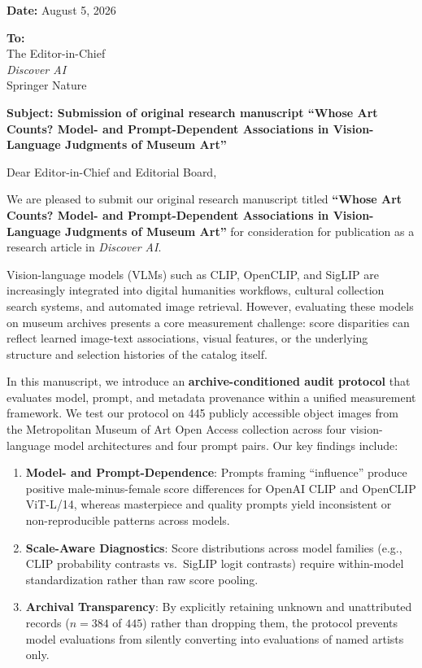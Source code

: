 \documentclass[11pt,a4paper]{article}
\begin{document}
\begin{raggedleft}
\textbf{Date:} August 5, 2026\\
\end{raggedleft}

\textbf{To:}\\
The Editor-in-Chief\\
\textit{Discover AI}\\
Springer Nature\\

\vspace{1em}

\textbf{Subject: Submission of original research manuscript ``Whose Art Counts? Model- and Prompt-Dependent Associations in Vision-Language Judgments of Museum Art''}

\vspace{1em}

Dear Editor-in-Chief and Editorial Board,

We are pleased to submit our original research manuscript titled \textbf{``Whose Art Counts? Model- and Prompt-Dependent Associations in Vision-Language Judgments of Museum Art''} for consideration for publication as a research article in \textit{Discover AI}.

Vision-language models (VLMs) such as CLIP, OpenCLIP, and SigLIP are increasingly integrated into digital humanities workflows, cultural collection search systems, and automated image retrieval. However, evaluating these models on museum archives presents a core measurement challenge: score disparities can reflect learned image-text associations, visual features, or the underlying structure and selection histories of the catalog itself. 

In this manuscript, we introduce an \textbf{archive-conditioned audit protocol} that evaluates model, prompt, and metadata provenance within a unified measurement framework. We test our protocol on 445 publicly accessible object images from the Metropolitan Museum of Art Open Access collection across four vision-language model architectures and four prompt pairs. Our key findings include:

\begin{enumerate}
    \item \textbf{Model- and Prompt-Dependence}: Prompts framing ``influence'' produce positive male-minus-female score differences for OpenAI CLIP and OpenCLIP ViT-L/14, whereas masterpiece and quality prompts yield inconsistent or non-reproducible patterns across models.
    \item \textbf{Scale-Aware Diagnostics}: Score distributions across model families (e.g., CLIP probability contrasts vs.\ SigLIP logit contrasts) require within-model standardization rather than raw score pooling.
    \item \textbf{Archival Transparency}: By explicitly retaining unknown and unattributed records ($n=384$ of $445$) rather than dropping them, the protocol prevents model evaluations from silently converting into evaluations of named artists only.
\end{enumerate}
\end{document}
